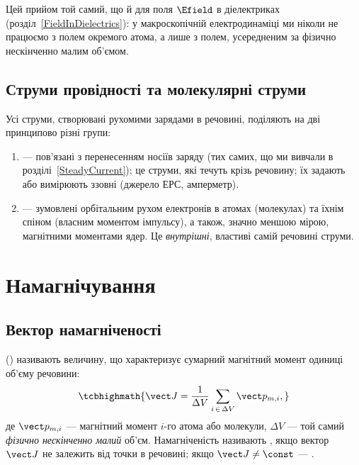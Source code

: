 Цей прийом той самий, що й для поля $\Efield$ в діелектриках (розділ~\ref{FieldInDielectrics}): у макроскопічній електродинаміці ми ніколи не працюємо з полем окремого атома, а лише з полем, усередненим за фізично нескінченно малим об'ємом.

\subsection*{Струми провідності та молекулярні струми}

Усі струми, створювані рухомими зарядами в речовині, поділяють на дві принципово різні групи:
\begin{enumerate}
	\item {} --- пов'язані з перенесенням  носіїв заряду (тих самих, що ми вивчали в розділі~\ref{SteadyCurrent}); це  струми, які течуть крізь речовину; їх задають або вимірюють ззовні (джерело ЕРС, амперметр).
	\item {} --- зумовлені орбітальним рухом електронів в атомах (молекулах) та їхнім спіном (власним моментом імпульсу), а
	      також, значно меншою мірою, магнітними моментами ядер. Це \emph{внутрішні}, властиві самій речовині струми.
\end{enumerate}

\section{Намагнічування}\hypertarget{magnetization}{}

\subsection*{Вектор намагніченості}

 () називають величину, що характеризує сумарний магнітний момент одиниці об'єму речовини:
\begin{equation}\label{eq:MagnetizationDef}
	\tcbhighmath{
		\vect J = \frac1{\Delta V}\sum\limits_{i\,\in\,\Delta V} \vect p_{m,i},
	}
\end{equation}
де $\vect p_{m,i}$ --- магнітний момент $i$-го атома або молекули, $\Delta V$ --- той самий \emph{фізично нескінченно малий} об'єм.
Намагніченість називають , якщо вектор $\vect J$ не залежить від точки в речовині; якщо $\vect J \neq \const$ --- .

